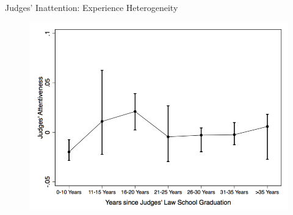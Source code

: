 \begin{frame}{Judges' Inattention: Experience Heterogeneity}
    \begin{figure}
        \centering
        \includegraphics[height = 0.6 \textheight]{images/attent_bylschyr_mean.png}
    \end{figure}
\end{frame}

